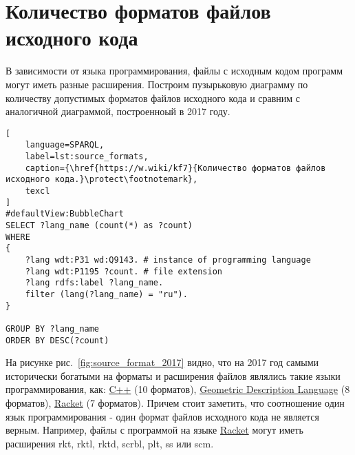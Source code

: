 \section{Количество форматов файлов исходного кода}
В зависимости от языка программирования, файлы с исходным кодом программ могут иметь разные расширения. Построим пузырьковую диаграмму по количеству допустимых форматов файлов исходного кода и сравним с аналогичной диаграммой, построенноый в 2017 году.

\pagebreak

\begin{lstlisting}[
	language=SPARQL,
	label=lst:source_formats,
	caption={\href{https://w.wiki/kf7}{Количество форматов файлов исходного кода.}\protect\footnotemark},
	texcl
]
#defaultView:BubbleChart
SELECT ?lang_name (count(*) as ?count)
WHERE
{
    ?lang wdt:P31 wd:Q9143. # instance of programming language
  	?lang wdt:P1195 ?count. # file extension
  	?lang rdfs:label ?lang_name.
    filter (lang(?lang_name) = "ru").
}

GROUP BY ?lang_name 
ORDER BY DESC(?count)
\end{lstlisting}

На рисунке рис.~\ref{fig:source_format_2017} видно, что на 2017 год самыми исторически богатыми на форматы и расширения файлов являлись такие языки программирования, как: \href{https://en.wikipedia.org/wiki/C++}{C++} (10 форматов), \href{https://en.wikipedia.org/wiki/Geometric_Description_Language}{Geometric Description Language} (8 форматов), \href{https://en.wikipedia.org/wiki/Racket_(programming_language)}{Racket} (7 форматов). Причем стоит заметить, что соотношение один язык программирования - один формат файлов исходного кода не является верным. Например, файлы с программой на языке \href{https://en.wikipedia.org/wiki/Racket_(programming_language)}{Racket} могут иметь расширения rkt, rktl, rktd, scrbl, plt, ss или scm.

